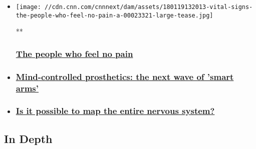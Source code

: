 \begin{itemize}
\item
  \href{/videos/health/2018/01/19/vital-signs-the-people-who-feel-no-pain-a.cnn}{}

  \texttt{[image: //cdn.cnn.com/cnnnext/dam/assets/180119132013-vital-signs-the-people-who-feel-no-pain-a-00023321-large-tease.jpg]}

  **

  \hypertarget{the-people-who-feel-no-pain}{%
  \subsubsection{\texorpdfstring{\href{/videos/health/2018/01/19/vital-signs-the-people-who-feel-no-pain-a.cnn}{The
  people who feel no
  pain}}{The people who feel no pain}}\label{the-people-who-feel-no-pain}}
\item
  \hypertarget{mind-controlled-prosthetics-the-next-wave-of-smart-arms}{%
  \subsubsection{\texorpdfstring{\href{/videos/health/2018/01/19/vital-signs-mind-controlled-prosthetics-the-next-wave-of-smart-arms-c.cnn}{Mind-controlled
  prosthetics: the next wave of 'smart
  arms'}}{Mind-controlled prosthetics: the next wave of 'smart arms'}}\label{mind-controlled-prosthetics-the-next-wave-of-smart-arms}}
\item
  \hypertarget{is-it-possible-to-map-the-entire-nervous-system}{%
  \subsubsection{\texorpdfstring{\href{/videos/health/2018/01/19/vital-signs-is-it-possible-to-map-the-entire-nervous-system-b.cnn}{Is
  it possible to map the entire nervous
  system?}}{Is it possible to map the entire nervous system?}}\label{is-it-possible-to-map-the-entire-nervous-system}}
\end{itemize}

\hypertarget{in-depth-}{%
\subsection{In Depth~}\label{in-depth-}}

